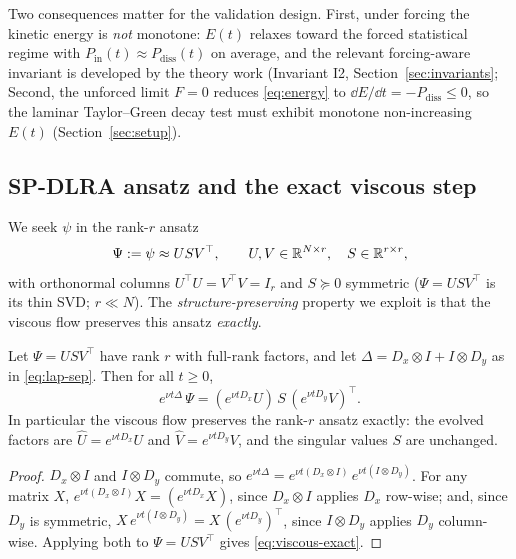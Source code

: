 Two consequences matter for the validation design. First, under forcing the
kinetic energy is \emph{not} monotone: $E(t)$ relaxes toward the forced
statistical regime with $P_{\mathrm{in}}(t) \approx P_{\mathrm{diss}}(t)$ on
average, and the relevant forcing-aware invariant is developed by the theory
work (Invariant I2, Section~\ref{sec:invariants};
Second, the unforced limit $F = 0$ reduces \eqref{eq:energy} to
$\dd E/\dd t = -P_{\mathrm{diss}} \le 0$, so the laminar Taylor--Green decay
test must exhibit monotone non-increasing $E(t)$ (Section~\ref{sec:setup}).

\subsection{SP-DLRA ansatz and the exact viscous step}
\label{sec:spd}

We seek $\psi$ in the rank-$r$ ansatz
\begin{equation}
  \Psi := \psi \approx U S V^{\top},
  \qquad U, V \in \mathbb{R}^{N \times r}, \quad S \in \mathbb{R}^{r \times r},
  \label{eq:ansatz}
\end{equation}
with orthonormal columns $U^{\top}U = V^{\top}V = I_r$ and $S \succeq 0$
symmetric ($\Psi = USV^{\top}$ is its thin SVD; $r \ll N$). The
\emph{structure-preserving} property we exploit is that the viscous flow
preserves this ansatz \emph{exactly}.

\begin{proposition}
\label{prop:viscous}
Let $\Psi = USV^{\top}$ have rank $r$ with full-rank factors, and let
$\Delta = D_x \otimes I + I \otimes D_y$ as in \eqref{eq:lap-sep}. Then for
all $t \ge 0$,
\begin{equation}
  e^{\nu t \Delta}\, \Psi
  =
  \left(e^{\nu t D_x} U\right)\, S \,
  \left(e^{\nu t D_y} V\right)^{\top}.
  \label{eq:viscous-exact}
\end{equation}
In particular the viscous flow preserves the rank-$r$ ansatz exactly: the
evolved factors are $\hat U = e^{\nu t D_x} U$ and
$\hat V = e^{\nu t D_y} V$, and the singular values $S$ are unchanged.
\end{proposition}

\begin{proof}
$D_x \otimes I$ and $I \otimes D_y$ commute, so
$e^{\nu t \Delta} = e^{\nu t (D_x \otimes I)}\, e^{\nu t (I \otimes D_y)}$.
For any matrix $X$, $e^{\nu t (D_x \otimes I)} X = (e^{\nu t D_x} X)$, since
$D_x \otimes I$ applies $D_x$ row-wise; and, since $D_y$ is symmetric,
$X\, e^{\nu t (I \otimes D_y)} = X\, (e^{\nu t D_y})^{\top}$, since
$I \otimes D_y$ applies $D_y$ column-wise. Applying both to
$\Psi = USV^{\top}$ gives \eqref{eq:viscous-exact}.
\end{proof}

